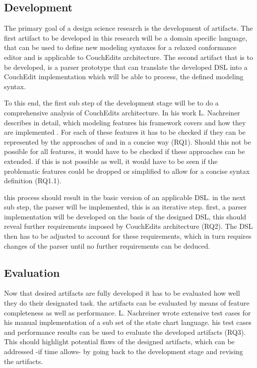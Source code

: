 \documentclass[10pt,a4paper,oneside]{scrartcl}
\begin{document}
\subsection{Development}
The primary goal of a design science research is the development of artifacts.
The first artifact to be developed in this research will be a domain specific language, that can be used to define new modeling syntaxes for a relaxed conformance editor and is applicable to CouchEdits architecture. The second artifact that is to be developed, is a parser prototype that can translate the developed DSL into a CouchEdit implementation which will be able to process, the defined modeling syntax.

To this end, the first sub step of the development stage will be to do a comprehensive analysis of CouchEdits architecture. In his work L. Nachreiner describes in detail, which modeling features his framework covers and how they are implemented \cite{nachreiner_couchedit_2020}. For each of these features it has to be checked if they can be represented by the approaches of \cite{minas_specifying_2001} and \cite{hutchison_making_2005} in a concise way (RQ1). Should this not be possible for all features, it would have to be checked if these approaches can be extended. if this is not possible as well, it would have to be seen if the problematic features could be dropped or simplified to allow for a concise syntax definition (RQ1.1).

this process should result in the basic version of an applicable DSL. in the next sub step, the parser will be implemented, this is an iterative step. first, a parser implementation will be developed on the basis of the designed DSL, this should reveal further requirements imposed by CouchEdits architecture (RQ2). The DSL then has to be adjusted to account for these requirements, which in turn requires changes of the parser until no further requirements can be deduced. 

\subsection{Evaluation}
Now that desired artifacts are fully developed it has to be evaluated how well they do their designated task. the artifacts can be evaluated by means of feature completeness as well as performance. L. Nachreiner wrote extensive test cases for his manual implementation of a sub set of the state chart language. his test cases and performance results can be used to evaluate the developed artifacts (RQ3). This should highlight potential flaws of the designed artifacts, which can be addressed -if time allows- by going back to the development stage and revising the artifacts.
\end{document}
